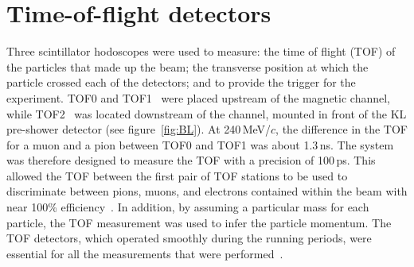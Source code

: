 \graphicspath{{02-TOF/Figures/}}

\newcommand{\Tzero}{\ensuremath{T0}}
\newcommand{\Gauss}{\ensuremath{\text{G}}}
\newcommand{\Dt}{\ensuremath{\Delta t}}
\newcommand{\us}{\ensuremath{\mu\text{s}}}

\section{Time-of-flight detectors}
\label{Sect:TOF}

Three scintillator hodoscopes were used to measure: the time of flight
(TOF) of the particles that made up the beam; the transverse position
at which the particle crossed each of the detectors; and to provide
the trigger for the experiment. 
TOF0 and TOF1~\cite{NOTE145,NOTE241,2010NIMPA.615...14B} were
placed upstream of the magnetic channel, while TOF2~\cite{NOTE286}
was located downstream of the channel, mounted in front of the KL
pre-shower detector (see figure~\ref{fig:BL}).
At 240\,MeV/$c$, the difference in the TOF for a muon and a
pion between TOF0 and TOF1 was about 1.3\,ns.
The system was therefore designed to measure the TOF with a
precision of 100\,ps. 
This allowed the TOF between the first pair of TOF stations 
to be used to discriminate between pions, muons, and electrons
contained within the beam with near 100\% efficiency~\cite{2016JInst..11P3001A}.
In addition, by assuming a particular mass for each particle, the
TOF measurement was used to infer the particle
momentum.
The TOF detectors, which operated smoothly during the running periods,
were essential for all the measurements that were
performed~\cite{Bogomilov:2012sr,Adams:2013lba,2015JInst..10P2012A,2016JInst..11P3001A,Adams:2018qhj,Bogomilov:2019kfj}.

